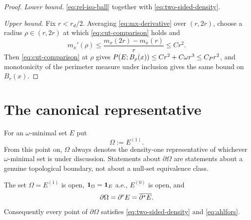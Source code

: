\begin{proof}
\emph{Lower bound.}  \eqref{eq:rel-iso-ball} together with
\eqref{eq:two-sided-density}.

\emph{Upper bound.}  Fix $r<r_d/2$.  Averaging \eqref{eq:mx-derivative} over
$(r,2r)$, choose a radius $\rho\in(r,2r)$ at which
\eqref{eq:cut-comparison} holds and
\[
  m_x'(\rho)\le\frac{m_x(2r)-m_x(r)}{r}\le Cr^2 .
\]
Then \eqref{eq:cut-comparison} at $\rho$ gives
$P(E;B_\rho(x))\le Cr^2+C\omega r^3\le C_Pr^2$, and monotonicity of the
perimeter measure under inclusion gives the same bound on $B_r(x)$.
\end{proof}

\section{The canonical representative}

\begin{convention}\label{conv:representative}
For an $\omega$-minimal set $E$ put
\begin{equation}\label{eq:representative}
  \Omega:=E^{(1)} .
\end{equation}
From this point on, $\Omega$ always denotes the density-one representative of
whichever $\omega$-minimal set is under discussion.  Statements about
$\partial\Omega$ are statements about a genuine topological boundary, not
about a null-set equivalence class.
\end{convention}

\begin{lemma}\label{lem:open-representative}
The set $\Omega=E^{(1)}$ is open, $\mathbf 1_{\Omega}=\mathbf 1_{E}$ a.e., $E^{(0)}$ is open,
and
\begin{equation}\label{eq:boundary-identification}
  \partial\Omega=\partial^{\mathrm e} E=\overline{\partial^* E} .
\end{equation}
Consequently every point of $\partial\Omega$ satisfies
\eqref{eq:two-sided-density} and \eqref{eq:ahlfors}.
\end{lemma}

